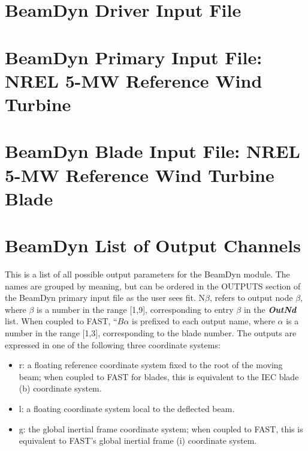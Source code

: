 \appendix
\chapter{BeamDyn Driver Input File}
\label{sec:AppDriver}



\chapter{BeamDyn Primary Input File: NREL 5-MW Reference Wind Turbine}
\label{sec:AppPrimary}


\chapter{BeamDyn Blade Input File: NREL 5-MW Reference Wind Turbine Blade}
\label{sec:AppBlade}


\chapter{BeamDyn List of Output Channels}
\label{sec:AppOutputChannel}
This is a list of all possible output parameters for the BeamDyn module.  The names are grouped by meaning, but can be ordered in the OUTPUTS section of the BeamDyn primary input file as the user sees fit.  N$\beta$, refers to output node $\beta$, where $\beta$ is a number in the range [1,9], corresponding to entry $\beta$ in the \textbf{\textit{OutNd}} list. When coupled to FAST, ``$B\alpha$ is prefixed to each output name, where $\alpha$ is a number in the range [1,3], corresponding to the blade number.  The outputs are expressed in one of the following three coordinate systems:
\begin{itemize}
    \item r: a floating reference coordinate system fixed to the root of the moving beam; when coupled to FAST for blades, this is equivalent to the IEC blade (b) coordinate system.
    \item l: a floating coordinate system local to the deflected beam.
    \item g: the global inertial frame coordinate system; when coupled to FAST, this is equivalent to FAST's global inertial frame (i) coordinate system.
\end{itemize}
